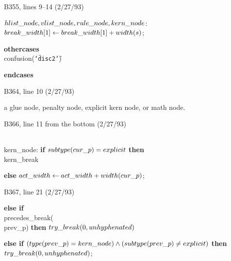\bugonpage B355, lines 9--14 (2/27/93)

\ninepoint\noindent\hskip20pt
$\\{hlist\_node},\\{vlist\_node},\\{rule\_node},\\{kern\_node}$:
    $\\{break\_width}[1]\gets\\{break\_width}[1]+\\{width}(s)$;\par
\noindent\hskip20pt
{\bf othercases} \\{confusion}({\tt\char`\"disc2\char`\"})\par
\noindent\hskip20pt
{\bf endcases}

\bugonpage B364, line 10 (2/27/93)

\tenpoint\noindent
a glue node, penalty node, explicit kern node, or math node.

\bugonpage B366, line 11 from the bottom (2/27/93)

\ninepoint\noindent
\\{kern\_node}: {\bf if\/} $\\{subtype}(\\{cur\_p})=\\{explicit}$
 {\bf then} \\{kern\_break}\par\noindent\hskip10pt
{\bf else} $\\{act\_width}\gets\\{act\_width}+\\{width}(\\{cur\_p})$;

\bugonpage B367, line 21 (2/27/93)

\ninepoint\noindent\hskip20pt
{\bf else if\/} \\{precedes\_break}(\\{prev\_p}) {\bf then}
 $\\{try\_break}(0,\\{unhyphenated})$\par\noindent\hskip20pt
{\bf else if\/} $(\\{type}(\\{prev\_p})=\\{kern\_node})\land
 (\\{subtype}(\\{prev\_p})\ne\\{explicit})$ {\bf then}
 $\\{try\_break}(0,\\{unhyphenated})$;

